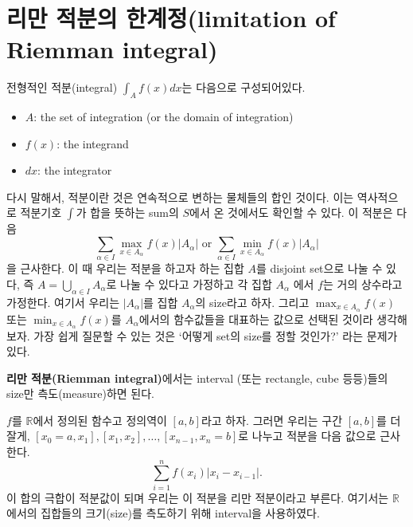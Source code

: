 \documentclass[b5paper,]{scrbook}
\theoremstyle{plain}
\theoremstyle{definition}
\numberwithin{equation}{section}
\let\BeginKnitrBlock\begin \let\EndKnitrBlock\end
\begin{document}
\hypertarget{--limitation-of-riemman-integral}{%
\section{리만 적분의 한계정(limitation of Riemman integral)}\label{--limitation-of-riemman-integral}}

전형적인 적분(integral) \(\int_{A}f(x)dx\)는 다음으로 구성되어있다.

\begin{itemize}
\item
  \(A\): the set of integration (or the domain of integration)
\item
  \(f(x)\): the integrand
\item
  \(dx\): the integrator
\end{itemize}

다시 말해서, 적분이란 것은 연속적으로 변하는 물체들의 합인 것이다. 이는 역사적으로 적분기호 \(\int\)가 합을 뜻하는 sum의 \(S\)에서 온 것에서도 확인할 수 있다. 이 적분은 다음
\[\sum_{\alpha\in I}\max_{x\in A_{\alpha}}f(x)|A_{\alpha}| \text{ or } \sum_{\alpha\in I}\min_{x\in A_{\alpha}}f(x)|A_{\alpha}|\]
을 근사한다. 이 때 우리는 적분을 하고자 하는 집합 \(A\)를 disjoint set으로 나눌 수 있다, 즉 \(A=\bigcup_{\alpha\in I}A_{\alpha}\)로 나눌 수 있다고 가정하고 각 집합 \(A_{\alpha}\) 에서 \(f\)는 거의 상수라고 가정한다. 여기서 우리는 \(|A_{\alpha}|\)를 집합 \(A_{\alpha}\)의 size라고 하자. 그리고 \(\max_{x\in A_{\alpha}}f(x)\) 또는 \(\min_{x\in A_{\alpha}}f(x)\)를 \(A_{\alpha}\)에서의 함수값들을 대표하는 값으로 선택된 것이라 생각해보자. 가장 쉽게 질문할 수 있는 것은 `어떻게 set의 size를 정할 것인가?' 라는 문제가 있다.

\textbf{리만 적분(Riemman integral)}에서는 interval (또는 rectangle, cube 등등)들의 size만 측도(measure)하면 된다.

\BeginKnitrBlock{example}[정의역과 치역이 1차원인 함수에서의 리만 적분]
\protect\hypertarget{exm:unnamed-chunk-49}{}{\label{exm:unnamed-chunk-49} {} }\(f\)를 \(\mathbb{R}\)에서 정의된 함수고 정의역이 \([a,b]\)라고 하자. 그러면 우리는 구간 \([a,b]\)를 더 잘게, \([x_{0}=a,x_{1}], [x_{1},x_{2}],\ldots, [x_{n-1},x_{n}=b]\)로 나누고 적분을 다음 값으로 근사한다.
\[\sum_{i=1}^{n}f(x_{i})|x_{i}-x_{i-1}|.\]
이 합의 극합이 적분값이 되며 우리는 이 적분을 리만 적분이라고 부른다. 여기서는 \(\mathbb{R}\)에서의 집합들의 크기(size)를 측도하기 위해 interval을 사용하였다.
\EndKnitrBlock{example}
\end{document}
